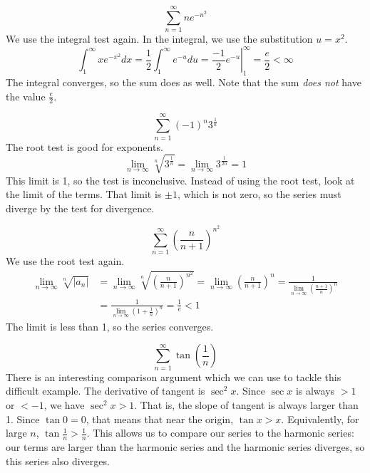 \documentclass[fleqn,letterpaper]{report}
\begin{document}
\begin{example}
\begin{equation*}
\sum_{n=1}^\infty ne^{-n^2}
\end{equation*}
We use the integral test again. In the integral, we use the
substitution $u =x^2$.
\begin{equation*}
\int_1^\infty x e^{-x^2} dx = \frac{1}{2} \int_1^\infty e^{-u}
du = \left. \frac{-1}{2} e^{-u} \right|_1^\infty = \frac{e}{2} <
\infty 
\end{equation*}
The integral converges, so the sum does as well. Note
that the sum \emph{does not} have the value $\frac{e}{2}$.
\end{example}

\begin{example}
\begin{equation*}
\sum_{n=1}^\infty (-1)^n 3^{\frac{1}{n}} 
\end{equation*}
The root test is good for exponents.
\begin{equation*}
\lim_{n \rightarrow \infty} \sqrt[n]{3^{\frac{1}{n}}} = \lim_{n
\rightarrow \infty} 3^{\frac{1}{2n}} = 1
\end{equation*}
This limit is 1, so the test is inconclusive. Instead of
using the root test, look at the limit of the terms. That
limit is $\pm 1$, which is not zero, so the series must
diverge by the test for divergence.
\end{example}

\begin{example}
\begin{equation*}
\sum_{n=1}^\infty \left( \frac{n}{n+1} \right)^{n^2}
\end{equation*}
We use the root test again.
\begin{align*}
\lim_{n \rightarrow \infty} \sqrt[n]{|a_n|} & = 
\lim_{n \rightarrow \infty} \sqrt[n]{\left(
\frac{n}{n+1}\right)^{n^2} } 
= \lim_{n \rightarrow \infty} \left( \frac{n}{n+1} \right)^n
= \frac{1}{\lim_{n \rightarrow \infty} \left( \frac{n+1}{n}
\right)^n} \\
& = \frac{1}{\lim_{n \rightarrow \infty} \left( 1 + \frac{1}{n}
\right)^n} = \frac{1}{e} < 1
\end{align*}
The limit is less than 1, so the series converges. 
\end{example}

\begin{example}
\begin{equation*}
\sum_{n=1}^\infty \tan \left( \frac{1}{n} \right) 
\end{equation*}
There is an interesting comparison argument which we can use
to tackle this difficult example. The derivative of tangent
is $\sec^2 x$. Since $\sec x$ is always $>1$ or $<-1$, we
have $\sec^2x > 1$. That is, the slope of tangent is always
larger than 1. Since $\tan 0 = 0$, that means that near the
origin, $\tan x > x$. Equivalently, for large $n$, $\tan
\frac{1}{n} > \frac{1}{n}$. This allows us to compare our
series to the harmonic series: our terms are larger than the
harmonic series and the harmonic series diverges, so this
series also diverges.
\end{example}
\end{document}
